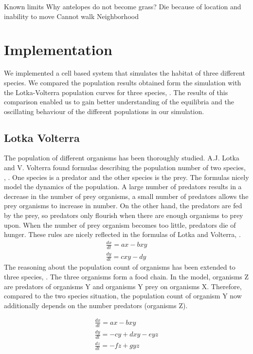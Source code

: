 \documentclass[11pt]{article}
\begin{document}
Known limits
Why antelopes do not become grass?
Die because of location and inability to move
Cannot walk
Neighborhood

\section{Implementation}
We implemented a cell based system that simulates the habitat of three different species.
We compared the population results obtained form the simulation with the Lotka-Volterra population curves for three species, \cite{lotkaVolterraThreeSpecies}. The results of this comparison enabled us to gain better understanding of the equilibria and the oscillating behaviour of the different populations in our simulation.

\subsection{Lotka Volterra}
The population of different organisms has been thoroughly studied. A.J. Lotka and V. Volterra found formulas describing the population number of two species, \cite{lotka}, \cite{volterra}. One species is a predator and the other species is the prey. The formulas nicely model the dynamics of the population. A large number of predators results in a decrease in the number of prey organisms, a small number of predators allows the prey organisms to increase in number. On the other hand, the predators are fed by the prey, so predators only flourish when there are enough organisms to prey upon. When the number of prey organism becomes too little, predators die of hunger. These rules are nicely reflected in the formulas of Lotka and Volterra, \cite{lotkaVolterra}.\\

\begin{equation}
\begin{split}
\frac{dx}{dt} = ax-bxy \\ 
\frac{dy}{dt} = cxy-dy
\end{split}
\end{equation}
The reasoning about the population count of organisms has been extended to three species, \cite{lotkaVolterraThreeSpecies}. The three organisms form a food chain. In the model, organisms Z are predators of organisms Y and organisms Y prey on organisms X. Therefore, compared to the two species situation, the population count of organism Y now additionally depends on the number predators (organisms Z). 

\begin{equation}
\begin{split}
\frac{dx}{dt} = ax-bxy \\ 
\frac{dy}{dt} = -cy+dxy-eyz \\ 
\frac{dz}{dt} = -fz+gyz
\end{split}
\end{equation}
\end{document}
